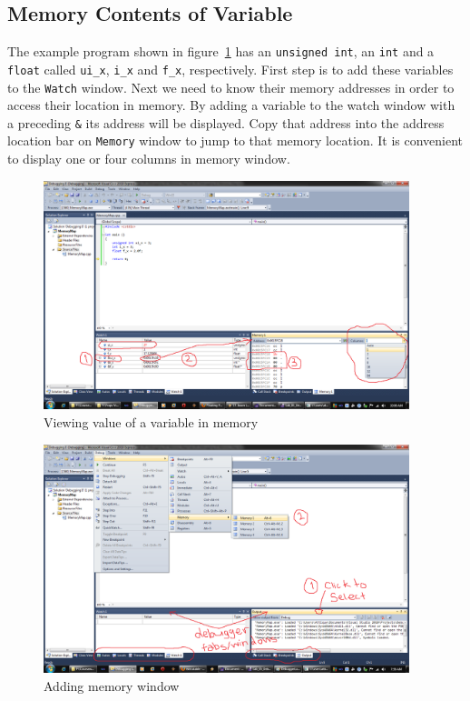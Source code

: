 \documentclass{article}
\begin{document}
\subsection{Memory Contents of Variable}
The example program shown in figure~\ref{Debugger-Layout} has an \verb|unsigned int|, an \verb|int| and a \verb|float| called \verb|ui_x|, \verb|i_x| and \verb|f_x|, respectively. First step is to add these variables to the \verb|Watch| window. Next we need to know their memory addresses in order to access their location in memory. By adding a variable to the watch window with a preceding \verb|&| its address will be displayed. Copy that address into the address location bar on \verb|Memory| window to jump to that memory location. It is convenient to display one or four columns in memory window.

\begin{figure}[H]
\centering
\label{Debugger-Layout}
\includegraphics[width=0.95\textwidth]{DebuggerLayout.png}
\caption{Viewing value of a variable in memory}
\end{figure}

\begin{figure}[H]
\centering
\label{Adding-Memory-Window}
\includegraphics[width=0.95\textwidth]{AddingMemoryWindow.png}
\caption{Adding memory window}
\end{figure}
\end{document}
